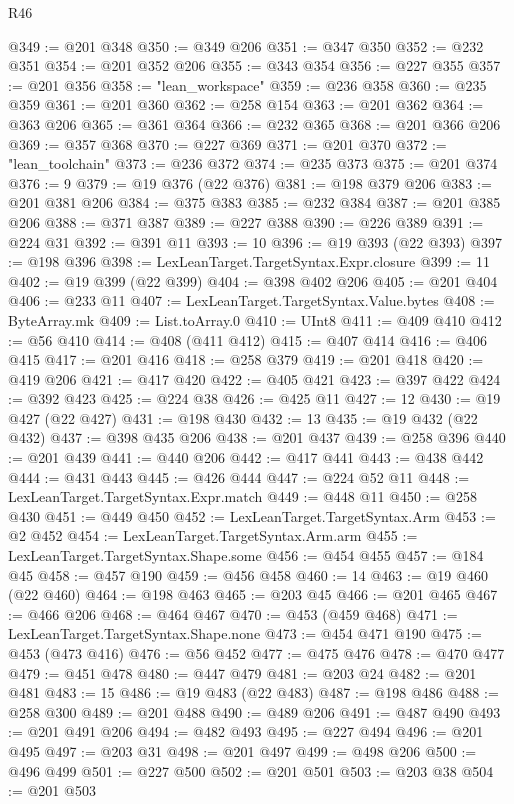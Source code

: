 \begin{lexlean}{R46}
\begin{coremodule}
@349 := @201 @348
@350 := @349 @206
@351 := @347 @350
@352 := @232 @351
@354 := @201 @352 @206
@355 := @343 @354
@356 := @227 @355
@357 := @201 @356
@358 := "lean_workspace"
@359 := @236 @358
@360 := @235 @359
@361 := @201 @360
@362 := @258 @154
@363 := @201 @362
@364 := @363 @206
@365 := @361 @364
@366 := @232 @365
@368 := @201 @366 @206
@369 := @357 @368
@370 := @227 @369
@371 := @201 @370
@372 := "lean_toolchain"
@373 := @236 @372
@374 := @235 @373
@375 := @201 @374
@376 := 9
@379 := @19 @376 (@22 @376)
@381 := @198 @379 @206
@383 := @201 @381 @206
@384 := @375 @383
@385 := @232 @384
@387 := @201 @385 @206
@388 := @371 @387
@389 := @227 @388
@390 := @226 @389
@391 := @224 @31
@392 := @391 @11
@393 := 10
@396 := @19 @393 (@22 @393)
@397 := @198 @396
@398 := LexLeanTarget.TargetSyntax.Expr.closure
@399 := 11
@402 := @19 @399 (@22 @399)
@404 := @398 @402 @206
@405 := @201 @404
@406 := @233 @11
@407 := LexLeanTarget.TargetSyntax.Value.bytes
@408 := ByteArray.mk
@409 := List.toArray.{0}
@410 := UInt8
@411 := @409 @410
@412 := @56 @410
@414 := @408 (@411 @412)
@415 := @407 @414
@416 := @406 @415
@417 := @201 @416
@418 := @258 @379
@419 := @201 @418
@420 := @419 @206
@421 := @417 @420
@422 := @405 @421
@423 := @397 @422
@424 := @392 @423
@425 := @224 @38
@426 := @425 @11
@427 := 12
@430 := @19 @427 (@22 @427)
@431 := @198 @430
@432 := 13
@435 := @19 @432 (@22 @432)
@437 := @398 @435 @206
@438 := @201 @437
@439 := @258 @396
@440 := @201 @439
@441 := @440 @206
@442 := @417 @441
@443 := @438 @442
@444 := @431 @443
@445 := @426 @444
@447 := @224 @52 @11
@448 := LexLeanTarget.TargetSyntax.Expr.match
@449 := @448 @11
@450 := @258 @430
@451 := @449 @450
@452 := LexLeanTarget.TargetSyntax.Arm
@453 := @2 @452
@454 := LexLeanTarget.TargetSyntax.Arm.arm
@455 := LexLeanTarget.TargetSyntax.Shape.some
@456 := @454 @455
@457 := @184 @45
@458 := @457 @190
@459 := @456 @458
@460 := 14
@463 := @19 @460 (@22 @460)
@464 := @198 @463
@465 := @203 @45
@466 := @201 @465
@467 := @466 @206
@468 := @464 @467
@470 := @453 (@459 @468)
@471 := LexLeanTarget.TargetSyntax.Shape.none
@473 := @454 @471 @190
@475 := @453 (@473 @416)
@476 := @56 @452
@477 := @475 @476
@478 := @470 @477
@479 := @451 @478
@480 := @447 @479
@481 := @203 @24
@482 := @201 @481
@483 := 15
@486 := @19 @483 (@22 @483)
@487 := @198 @486
@488 := @258 @300
@489 := @201 @488
@490 := @489 @206
@491 := @487 @490
@493 := @201 @491 @206
@494 := @482 @493
@495 := @227 @494
@496 := @201 @495
@497 := @203 @31
@498 := @201 @497
@499 := @498 @206
@500 := @496 @499
@501 := @227 @500
@502 := @201 @501
@503 := @203 @38
@504 := @201 @503

\end{coremodule}
\end{lexlean}
